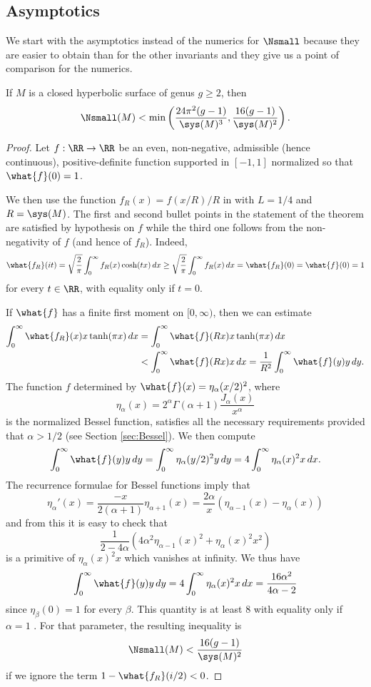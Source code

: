 \documentclass[12pt]{amsart}
\numberwithin{equation}{section}
\begin{document}
\subsection{Asymptotics}

We start with the asymptotics instead of the numerics for $\Nsmall$
because they are easier to obtain than for the other invariants and they give us a point of comparison for the numerics.

\begin{thm}\label{thm:small_asymp}
If $M$ is a closed hyperbolic surface of genus $g\geq 2$, then
\[
\Nsmall(M) <  \min\left( \frac{24 \pi^2(g-1)}{\sys(M)^3}, \frac{16(g-1)}{\sys(M)^2} \right).
\]
\end{thm}
\begin{proof}
Let $f: \RR \to \RR$ be an even, non-negative, admissible (hence continuous), positive-definite function supported in $[-1,1]$ normalized so that $\what{f}(0)=1$.

We then use the function $f_R(x)=f(x/R)/R$ in  with $L=1/4$ and $R =\sys(M)$. The first and second bullet points in the statement of the theorem are satisfied by hypothesis on $f$ while the third one follows from the non-negativity of $f$ (and hence of $f_R$). Indeed, 
\[
\what{f_R}(it) = \sqrt{\frac{2}{\pi}} \int_0^\infty f_R(x) \cosh(tx) \,dx \geq \sqrt{\frac{2}{\pi}} \int_0^\infty f_R(x) \,dx = \what{f_R}(0) = \what{f}(0) = 1
\]
for every $t \in \RR$, with equality only if $t=0$.

If $\what{f}$ has a finite first moment on $[0,\infty)$, then we can estimate
\begin{align*}
\int_0^\infty \what{f_R}(x) x \tanh(\pi x) \,dx &= \int_0^\infty \what{f}(Rx) x \tanh(\pi x) \,dx \\
&< \int_0^\infty \what{f}(Rx) x\,dx = \frac{1}{R^2}\int_0^\infty \what{f}(y) y\,dy.
\end{align*}
The function $f$ determined by $\what{f}(x) = \eta_\alpha(x/2)^2$, where
\[
\eta_\alpha(x) = 2^\alpha \Gamma(\alpha+1) \frac{J_\alpha(x) }{x^\alpha} 
\]
is the normalized Bessel function, satisfies all the necessary requirements provided that $\alpha>1/2$ (see Section \ref{sec:Bessel}). We then compute
\[
 \int_0^\infty \what{f}(y) y \, dy = \int_0^\infty \eta_\alpha(y/2)^2 y\,dy = 4 \int_0^\infty \eta_\alpha(x)^2 x\,dx.
\]
The recurrence formulae for Bessel functions \cite[p.2]{Watson} imply that
\[
\eta_\alpha'(x) = \frac{-x}{2(\alpha+1)} \eta_{\alpha+1}(x) = \frac{2\alpha}{x} (\eta_{\alpha-1}(x) - \eta_\alpha(x))
\]
and from this it is easy to check that
\[
\frac{1}{2-4\alpha}\left( 4\alpha^2 \eta_{\alpha-1}(x)^2 + \eta_\alpha(x)^2 x^2 \right)
\]
is a primitive of $\eta_\alpha(x)^2 x$ which vanishes at infinity. We thus have
\[
\int_0^\infty \what{f}(y) y \, dy = 4\int_0^\infty \eta_\alpha(x)^2 x\,dx = \frac{16 \alpha^2}{4 \alpha -2}
\]
since $\eta_\beta(0)=1$ for every $\beta$. This quantity is at least $8$ with equality only if $\alpha=1$ . For that parameter, the resulting inequality is
\[
\Nsmall(M) < \frac{16(g-1)}{\sys(M)^2}
\]
if we ignore the term $1-\what{f_R}(i/2) < 0$.


\end{proof}
\end{document}
